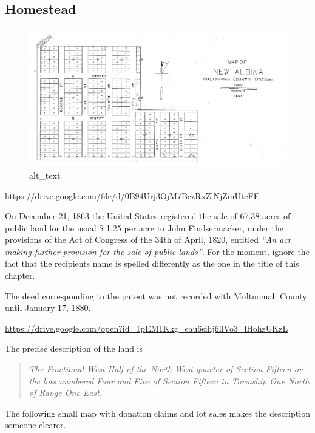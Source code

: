 \documentclass[
  12pt,
]{book}
\begin{document}
\hypertarget{homestead-3}{%
\subsection{Homestead}\label{homestead-3}}

\begin{figure}
\centering
\includegraphics{images/0204a_images/image2.png}
\caption{alt\_text}
\end{figure}

\url{https://drive.google.com/file/d/0B94Urj3OjM7BczRxZlNjZmUtcFE}

On December 21, 1863 the United States registered the sale of 67.38 acres of public land for the usual \$ 1.25 per acre to John Findsermacker, under the provisions of the Act of Congress of the 34th of April, 1820, entitled \emph{``An act making further provision for the sale of public lands''}. For the moment, ignore the fact that the recipients name is spelled differently as the one in the title of this chapter.

The deed corresponding to the patent was not recorded with Multnomah County until January 17, 1880.

\url{https://drive.google.com/open?id=1pEM1Kkg_eau6sihj6llVo3_lHohzUKzL}

The precise description of the land is

\begin{quote}
\emph{The Fractional West Half of the North West quarter of Section Fifteen or the lots numbered Four and Five of Section Fifteen in Township One North of Range One East.}
\end{quote}

The following small map with donation claims and lot sales makes the description someone clearer.
\end{document}
